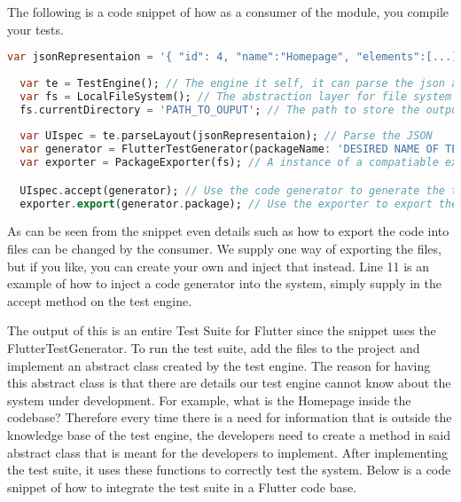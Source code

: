 The following is a code snippet of how as a consumer of the module, you compile your tests.

\begin{lstlisting}[language=dart, caption={How to configure and use the Test Generator Package.}]
  var jsonRepresentaion = '{ "id": 4, "name":"Homepage", "elements":[...]}'; //The output from the Mobile application
  
  var te = TestEngine(); // The engine it self, it can parse the json and use a codegenerator
  var fs = LocalFileSystem(); // The abstraction layer for file system
  fs.currentDirectory = 'PATH_TO_OUPUT'; // The path to store the output test suite
  
  var UIspec = te.parseLayout(jsonRepresentaion); // Parse the JSON
  var generator = FlutterTestGenerator(packageName: 'DESIRED NAME OF TEST PACKAGE'); // An instance of a compatiable code generator
  var exporter = PackageExporter(fs); // A instance of a compatiable exporter.

  UIspec.accept(generator); // Use the code generator to generate the test suite
  exporter.export(generator.package); // Use the exporter to export the test suite to the file system.
\end{lstlisting}

As can be seen from the snippet even details such as how to export the code into files can be changed by the consumer. 
We supply one way of exporting the files, but if you like, you can create your own and inject that instead. 
Line 11 is an example of how to inject a code generator into the system, simply supply in the accept method on the test engine.

The output of this is an entire Test Suite for Flutter since the snippet uses the FlutterTestGenerator. 
To run the test suite, add the files to the project and implement an abstract class created by the test engine. 
The reason for having this abstract class is that there are details our test engine cannot know about the system under development.
For example, what is the Homepage inside the codebase?
Therefore every time there is a need for information that is outside the knowledge base of the test engine, the developers need to create a method in said abstract class that is meant for the developers to implement. 
After implementing the test suite, it uses these functions to correctly test the system.
Below is a code snippet of how to integrate the test suite in a Flutter code base.


